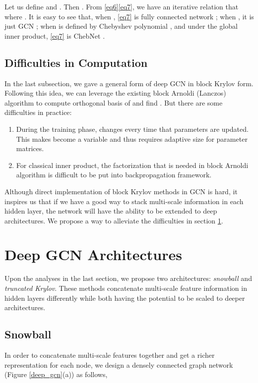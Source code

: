 \documentclass{article}
\begin{document}
Let us define  and . Then . From \eqref{eq6}\eqref{eq7}, we have an iterative relation that  where . It is easy to see that, when , \eqref{eq7} is fully connected network \cite{li2018deeper}; when , it is just GCN \cite{kipf2016classification}; when  is defined by Chebyshev polynomial \cite{hammond2011wavelets},  and under the global inner product, \eqref{eq7} is ChebNet \cite{defferrard2016fast}.

\subsection{Difficulties in Computation}
\label{difficulty}
In the last subsection, we gave a general form of deep GCN in block Krylov form. Following this idea, we can leverage the existing block Arnoldi (Lanczos) algorithm \cite{frommer2017block, frommer2017radau} to compute orthogonal basis of  and find . But there are some difficulties in practice:
\begin{enumerate}[leftmargin=12pt]
\item During the training phase,  changes every time that parameters are updated. This makes  become a variable and thus requires adaptive size for parameter matrices.
\item For classical inner product, the  factorization that is needed in block Arnoldi algorithm \cite{frommer2017block} is difficult to be put into backpropagation framework.
\end{enumerate}

Although direct implementation of block Krylov methods in GCN is hard, it inspires us that if we have a good way to stack multi-scale information in each hidden layer, the network will have the ability to be extended to deep architectures. We propose a way to alleviate the difficulties in section \ref{deep}.
\section{Deep GCN Architectures}
\label{deep}
Upon the analyses in the last section, we propose two architectures: \textit{snowball} and \textit{truncated Krylov}. These methods concatenate multi-scale feature information in hidden layers differently while both having the potential to be scaled to deeper architectures.
\subsection{Snowball}
\label{snowball_gcn}

In order to concatenate multi-scale features together and get a richer representation for each node, we design a densely connected graph network (Figure \ref{deep_gcn}(a)) as follows,
\end{document}
